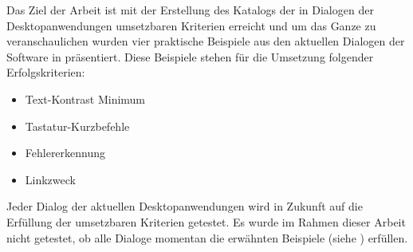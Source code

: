 Das Ziel der Arbeit ist mit der Erstellung des Katalogs der in Dialogen der Desktopanwendungen umsetzbaren Kriterien erreicht und um das Ganze zu veranschaulichen wurden vier praktische Beispiele aus den aktuellen Dialogen der Software in  präsentiert. Diese Beispiele stehen für die Umsetzung folgender Erfolgskriterien:

\begin{itemize}
	\item Text-Kontrast Minimum
	\item Tastatur-Kurzbefehle
	\item Fehlererkennung
	\item Linkzweck
\end{itemize}

Jeder Dialog der aktuellen Desktopanwendungen wird in Zukunft auf die Erfüllung der umsetzbaren Kriterien getestet. Es wurde im Rahmen dieser Arbeit nicht getestet, ob alle Dialoge momentan die erwähnten Beispiele (siehe ) erfüllen.